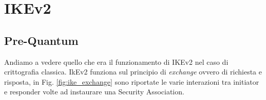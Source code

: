 
\newcommand{\drawkey}[3]{
    \draw[line width=0.07cm, draw=#2] (#1) circle [radius=0.15cm];
    \draw[line width=0.07cm, draw=#2] (#1 -0.15) -- ++(0,-0.4);
    \draw[line width=0.07cm, draw=#2] (#1 -0.35) -- ++(-0.2,0);
    \draw[line width=0.07cm, draw=#2] (#1 -0.51) -- ++(-0.2,0);
    \node[below, text=#2] at (#1 -0.6) {#3}
}

\newcommand{\drawcurlybrace}[3]{%
    \draw [decorate,decoration={brace,amplitude=10pt,mirror},xshift=-4pt,yshift=0pt]
    (#1) -- (#2) node [black,midway,xshift=-2cm] {};
}

\chapter{IKEv2}
\label{Chapter2} 

\section{Pre-Quantum}

Andiamo a vedere quello che era il funzionamento di IKEv2 nel caso di crittografia classica.
IkEv2 funziona sul principio di \textit{exchange} ovvero di richiesta e risposta, in Fig. \ref{fig:ike_exchange} sono riportate le varie interazioni tra 
initiator e responder volte ad instaurare una Security Association.

